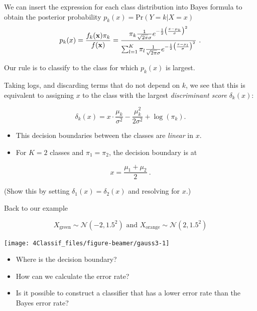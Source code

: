 \documentclass[10pt,ignorenonframetext,]{beamer}
\begin{document}
\begin{frame}

We can insert the expression for each class distribution into Bayes
formula to obtain the posterior probability
\(p_k(x) = \text{Pr}(Y = k | X = x)\)
\[p_k(x) = \frac{f_k({\bf x}) \pi_k}{f({\bf x})}=\frac{\pi_k \frac{1}{\sqrt{2\pi}\sigma} e^{-\frac{1}{2}\big(\frac{x-\mu_k}{\sigma}\big)^2}}{\sum_{l=1}^K \pi_l \frac{1}{\sqrt{2\pi}\sigma} e^{-\frac{1}{2}\big(\frac{x-\mu_l}{\sigma}\big)^2}} \ .\]

Our rule is to classify to the class for which \(p_k(x)\) is largest.

\end{frame}

\begin{frame}

Taking logs, and discarding terms that do not depend on \(k\), we see
that this is equivalent to assigning \(x\) to the class with the largest
\emph{discriminant score} \(\delta_k(x)\):

\[\delta_k(x) = x\cdot \frac{\mu_k}{\sigma^2} - \frac{\mu_k^2}{2 \sigma^2}+\log(\pi_k).\]

\begin{itemize}
\item
  This decision boundaries between the classes are \emph{linear} in
  \(x\).
\item
  For \(K=2\) classes and \(\pi_1=\pi_2\), the decision boundary is at
\end{itemize}

\[x = \frac{\mu_1+ \mu_2}{2} \ .\]

(Show this by setting \(\delta_1(x)=\delta_2(x)\) and resolving for
\(x\).)

\end{frame}

\begin{frame}

\begin{block}{Back to our example}

\[X_{\text{green}}\sim \mathcal{N}(-2, 1.5^2) \text{ and }
X_{\text{orange}}\sim \mathcal{N}(2, 1.5^2) \]

\begin{center}\texttt{[image: 4Classif\_files/figure-beamer/gauss3-1]} \end{center}

\begin{itemize}
\item
  Where is the decision boundary?
\item
  How can we calculate the error rate?
\item
  Is it possible to construct a classifier that has a lower error rate
  than the Bayes error rate?
\end{itemize}

\end{block}

\end{frame}
\end{document}
